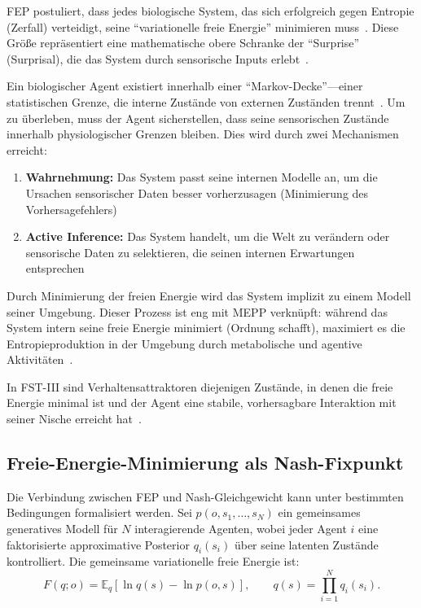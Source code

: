 \documentclass[12pt,a4paper]{article}
\theoremstyle{remark}
\begin{document}
FEP postuliert, dass jedes biologische System, das sich erfolgreich gegen Entropie (Zerfall) verteidigt, seine ``variationelle freie Energie'' minimieren muss~\citep{FristonFreeEnergy}. Diese Größe repräsentiert eine mathematische obere Schranke der ``Surprise'' (Surprisal), die das System durch sensorische Inputs erlebt~\citep{FristonFreeEnergy}.

Ein biologischer Agent existiert innerhalb einer ``Markov-Decke''---einer statistischen Grenze, die interne Zustände von externen Zuständen trennt~\citep{FristonPDF}. Um zu überleben, muss der Agent sicherstellen, dass seine sensorischen Zustände innerhalb physiologischer Grenzen bleiben. Dies wird durch zwei Mechanismen erreicht:

\begin{enumerate}
    \item \textbf{Wahrnehmung:} Das System passt seine internen Modelle an, um die Ursachen sensorischer Daten besser vorherzusagen (Minimierung des Vorhersagefehlers)~\citep{FristonFreeEnergy}
    \item \textbf{Active Inference:} Das System handelt, um die Welt zu verändern oder sensorische Daten zu selektieren, die seinen internen Erwartungen entsprechen~\citep{FristonFreeEnergy}
\end{enumerate}

Durch Minimierung der freien Energie wird das System implizit zu einem Modell seiner Umgebung. Dieser Prozess ist eng mit MEPP verknüpft: während das System intern seine freie Energie minimiert (Ordnung schafft), maximiert es die Entropieproduktion in der Umgebung durch metabolische und agentive Aktivitäten~\citep{FristonPDF}.

In FST-III sind Verhaltensattraktoren diejenigen Zustände, in denen die freie Energie minimal ist und der Agent eine stabile, vorhersagbare Interaktion mit seiner Nische erreicht hat~\citep{FristonFreeEnergy}.

\subsection{Freie-Energie-Minimierung als Nash-Fixpunkt}

Die Verbindung zwischen FEP und Nash-Gleichgewicht kann unter bestimmten Bedingungen formalisiert werden. Sei $p(o,s_1,\dots,s_N)$ ein gemeinsames generatives Modell für $N$ interagierende Agenten, wobei jeder Agent $i$ eine faktorisierte approximative Posterior $q_i(s_i)$ über seine latenten Zustände kontrolliert. Die gemeinsame variationelle freie Energie ist:
\begin{equation}
F(q; o) = \mathbb{E}_q\!\left[\ln q(s) - \ln p(o, s)\right], \qquad q(s) = \prod_{i=1}^{N} q_i(s_i).
\end{equation}
\end{document}
